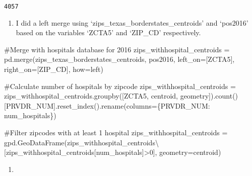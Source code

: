 \documentclass[
  letterpaper,
  DIV=11,
  numbers=noendperiod]{scrartcl}
\newenvironment{Shaded}{\begin{snugshade}}{\end{snugshade}}
\newcommand{\CommentTok}[1]{\textcolor[rgb]{0.37,0.37,0.37}{#1}}
\newcommand{\DecValTok}[1]{\textcolor[rgb]{0.68,0.00,0.00}{#1}}
\newcommand{\NormalTok}[1]{\textcolor[rgb]{0.00,0.23,0.31}{#1}}
\newcommand{\OperatorTok}[1]{\textcolor[rgb]{0.37,0.37,0.37}{#1}}
\newcommand{\StringTok}[1]{\textcolor[rgb]{0.13,0.47,0.30}{#1}}
\providecommand{\tightlist}{%
  \setlength{\itemsep}{0pt}\setlength{\parskip}{0pt}}\usepackage{longtable,booktabs,array}
\begin{document}
\begin{verbatim}
4057
\end{verbatim}

\begin{enumerate}
\def\labelenumi{\arabic{enumi}.}
\setcounter{enumi}{2}
\tightlist
\item
  I did a left merge using `zips\_texas\_borderstates\_centroids' and
  `pos2016' based on the variables `ZCTA5' and `ZIP\_CD' respectively.
\end{enumerate}

\begin{Shaded}
\begin{Highlighting}[]
\CommentTok{\#Merge with hospitals database for 2016}
\NormalTok{zips\_withhospital\_centroids }\OperatorTok{=}\NormalTok{ pd.merge(zips\_texas\_borderstates\_centroids, pos2016, left\_on}\OperatorTok{=}\NormalTok{[}\StringTok{\textquotesingle{}ZCTA5\textquotesingle{}}\NormalTok{], right\_on}\OperatorTok{=}\NormalTok{[}\StringTok{\textquotesingle{}ZIP\_CD\textquotesingle{}}\NormalTok{], how}\OperatorTok{=}\StringTok{\textquotesingle{}left\textquotesingle{}}\NormalTok{)}

\CommentTok{\#Calculate number of hospitals by zipcode}
\NormalTok{zips\_withhospital\_centroids }\OperatorTok{=}\NormalTok{ zips\_withhospital\_centroids.groupby([}\StringTok{\textquotesingle{}ZCTA5\textquotesingle{}}\NormalTok{, }\StringTok{\textquotesingle{}centroid\textquotesingle{}}\NormalTok{, }\StringTok{\textquotesingle{}geometry\textquotesingle{}}\NormalTok{]).count()[}\StringTok{\textquotesingle{}PRVDR\_NUM\textquotesingle{}}\NormalTok{].reset\_index().rename(columns}\OperatorTok{=}\NormalTok{\{}\StringTok{\textquotesingle{}PRVDR\_NUM\textquotesingle{}}\NormalTok{: }\StringTok{\textquotesingle{}num\_hospitals\textquotesingle{}}\NormalTok{\})}

\CommentTok{\#Filter zipcodes with at least 1 hospital}
\NormalTok{zips\_withhospital\_centroids }\OperatorTok{=}\NormalTok{ gpd.GeoDataFrame(zips\_withhospital\_centroids}\OperatorTok{\textbackslash{}}
\NormalTok{    [zips\_withhospital\_centroids[}\StringTok{\textquotesingle{}num\_hospitals\textquotesingle{}}\NormalTok{]}\OperatorTok{\textgreater{}}\DecValTok{0}\NormalTok{], geometry}\OperatorTok{=}\StringTok{\textquotesingle{}centroid\textquotesingle{}}\NormalTok{)}
\end{Highlighting}
\end{Shaded}

\begin{enumerate}
\def\labelenumi{\arabic{enumi}.}
\setcounter{enumi}{3}
\tightlist
\item
\end{enumerate}
\end{document}

